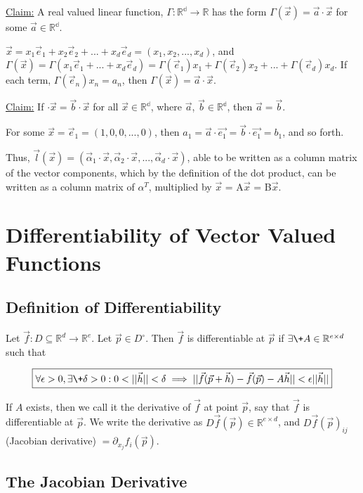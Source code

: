 \documentclass[11 pt, twoside]{article}
\begin{document}
\underline{Claim:} A real valued linear function, $\Gamma: \mathbb{R^d} \to \mathbb{R}$ has the form $\Gamma(\vec{x}) = \vec{a} \cdot \vec{x}$ for some $\vec{a} \in \mathbb{R^d}$.

$\vec{x} = x_1\vec{e}_1 + x_2\vec{e}_2 + ... + x_d\vec{e}_d = (x_1, x_2, ..., x_d)$, and $\Gamma(\vec{x}) = \Gamma(x_1\vec{e}_1 + ... + x_d\vec{e}_d) = \Gamma(\vec{e}_1)x_1 + \Gamma(\vec{e}_2)x_2 + ... + \Gamma(\vec{e}_d)x_d$. If each term, $\Gamma(\vec{e}_n)x_n = a_n$, then $\Gamma(\vec{x}) = \vec{a} \cdot \vec{x}$.

\underline{Claim:} If  $\cdot \vec{x}  = \vec{b} \cdot \vec{x}$ for all $\vec{x} \in \mathbb{R^d}$, where $\vec{a}$, $\vec{b} \in \mathbb{R^d}$, then $\vec{a} = \vec{b}$.

For some $\vec{x} = \vec{e}_1 = (1, 0, 0, ..., 0)$, then $a_1 = \vec{a} \cdot \vec{e_1} = \vec{b} \cdot \vec{e_1} = b_1$, and so forth.

Thus, $\vec{l}(\vec{x}) = (\vec{\alpha}_1 \cdot \vec{x}, \vec{\alpha}_2 \cdot \vec{x}, ..., \vec{\alpha}_d \cdot \vec{x})$, able to be written as a column matrix of the vector components, which by the definition of the dot product, can be written as a column matrix of $\alpha^T$, multiplied by $\vec{x}$ = A$\vec{x}$ = B$\vec{x}$.

\section{Differentiability of Vector Valued Functions}
\subsection{Definition of Differentiability}
Let $\vec{f} : D \subseteq \mathbb{R}^d \to \mathbb{R}^e$. Let $\vec{p}
\in D^\circ$. Then $\vec{f}$ is differentiable at $\vec{p}$ if $\exists \+A \in
\mathbb{R}^{e \times d}$ such that

$$\boxed{\forall \epsilon > 0, \exists \+ \delta > 0: 0 < ||\vec{h}|| < \delta
\implies ||\vec{f}(\vec{p} + \vec{h}) - \vec{f}(\vec{p}) - A
\vec{h}|| < \epsilon ||\vec{h}||}$$

If $A$ exists, then we call it the derivative of $\vec{f}$ at point $\vec{p}$, say that $\vec{f}$ is differentiable at $\vec{p}$. We write the derivative as $D\vec{f}(\vec{p}) \in \mathbb{R}^{e \times d}$, and $D\vec{f}(\vec{p})_{ij}$ (Jacobian derivative) $= \partial_{x_j} f_i (\vec{p})$.

\subsection{The Jacobian Derivative}
\end{document}

